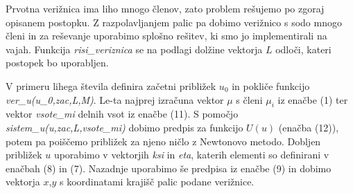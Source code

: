 \documentclass[A4paper, 11pt]{article}
\begin{document}
Prvotna verižnica ima liho mnogo členov, zato problem rešujemo po zgoraj opisanem postopku. Z razpolavljanjem palic pa dobimo verižnico s sodo mnogo členi in za reševanje uporabimo splošno rešitev, ki smo jo implementirali na vajah. Funkcija \textit{risi\_veriznica} se na podlagi dolžine vektorja $L$ odloči, kateri postopek bo uporabljen.

V primeru lihega števila definira začetni približek $u_0$ in pokliče funkcijo \textit{ver\_u(u\_0,zac,L,M)}. Le-ta najprej izračuna vektor $\mu$ s členi $\mu_i$ iz enačbe (1) ter vektor \textit{vsote\_mi} delnih vsot iz enačbe (11). S pomočjo \textit{sistem\_u(u,zac,L,vsote\_mi)} dobimo predpis za funkcijo $U(u)$ (enačba (12)), potem pa poiščemo približek za njeno ničlo z Newtonovo metodo. Dobljen približek $u$ uporabimo v vektorjih \textit{ksi} in \textit{eta}, katerih elementi so definirani v enačbah (8) in (7). Nazadnje uporabimo še predpisa iz enačbe (9) in dobimo vektorja $x$,$y$ s koordinatami krajišč palic podane verižnice.


\end{document}
